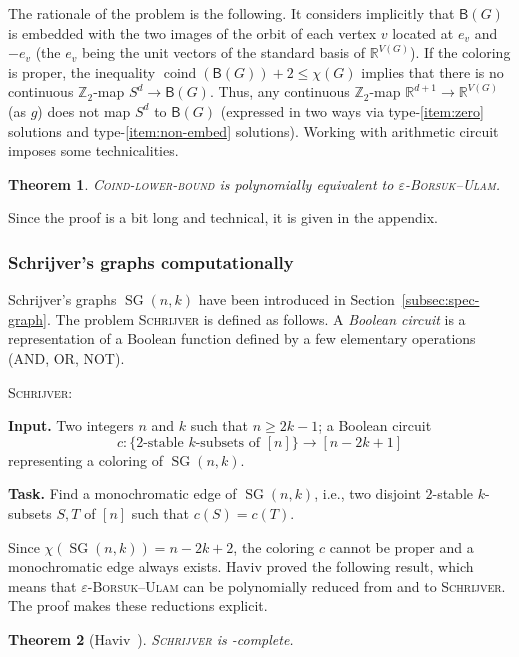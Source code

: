 \documentclass[12pt]{amsart}
\newtheorem{theorem}{Theorem}[section]
\theoremstyle{definition}
\def\R{\mathbb{R}}
\def\Z{\mathbb{Z}}
\def\B{\mathsf{B}}
\renewcommand{\geq}{\geqslant}
\renewcommand{\leq}{\leqslant}
\def\SG{\operatorname{SG}}
\def\coind{\operatorname{coind}}
\begin{document}
\medskip

The rationale of the problem is the following. It considers implicitly that $\B(G)$ is embedded with the two images of the orbit of each vertex $v$ located at $e_v$ and $-e_v$ (the $e_v$ being the unit vectors of the standard basis of $\R^{V(G)}$). If the coloring is proper, the inequality $\coind(\B(G))+2 \leq \chi(G)$ implies that there is no continuous $\Z_2$-map $S^d\rightarrow \B(G)$. Thus, any continuous $\Z_2$-map $\R^{d+1}\rightarrow\R^{V(G)}$ (as $g$) does not map $S^d$ to $\B(G)$ (expressed in two ways via type-\eqref{item:zero} solutions and type-\eqref{item:non-embed} solutions). Working with arithmetic circuit imposes some technicalities.


\begin{theorem}\label{thm:complex-coind}
    \textsc{Coind-lower-bound} is polynomially equivalent to \textsc{$\varepsilon$-Borsuk--Ulam}.
\end{theorem}

Since the proof is a bit long and technical, it is given in the appendix.

\subsubsection*{Schrijver's graphs computationally}
Schrijver's graphs $\SG(n,k)$ have been introduced in Section~\ref{subsec:spec-graph}. The problem \textsc{Schrijver} is defined as follows.  A {\em Boolean circuit} is a representation of a Boolean function defined by a few elementary operations (AND, OR, NOT).

\medskip

\noindent \textsc{Schrijver}:

{\bf Input.} Two integers $n$ and $k$ such that $n\geq 2k-1$; a Boolean circuit 
\[
c\colon \big\{2\text{-stable $k$-subsets of $[n]$}\big\} \rightarrow [n-2k+1]
\]
representing a coloring of $\SG(n,k)$.

{\bf Task.} Find a monochromatic edge of $\SG(n,k)$, i.e., two disjoint $2$-stable $k$-subsets $S,T$ of $[n]$ such that $c(S)=c(T)$.

\medskip

Since $\chi(\SG(n,k))=n-2k+2$, the coloring $c$ cannot be proper and a monochromatic edge always exists. Haviv proved the following result, which means that \textsc{$\varepsilon$-Borsuk--Ulam} can be polynomially reduced from and to \textsc{Schrijver}. The proof makes these reductions explicit.

\begin{theorem}[Haviv~\cite{haviv2022complexity}]
\textsc{Schrijver} is \PPA-complete.
\end{theorem}
\end{document}
